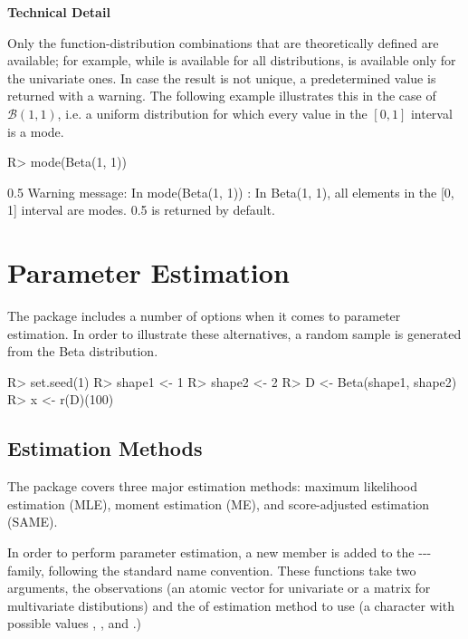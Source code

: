 \documentclass[nojss]{jss}
\newcommand{\fct}[1]{\code{#1()}}
\begin{document}
\begin{leftbar}
\textbf{Technical Detail}

Only the function-distribution combinations that are theoretically defined are available; for example, while \fct{var} is available for all distributions, \fct{sd} is available only for the univariate ones. In case the result is not unique, a predetermined value is returned with a warning. The following example illustrates this in the case of $\mathcal{B}(1, 1)$, i.e. a uniform distribution for which every value in the $[0, 1]$ interval is a mode.

\begin{CodeChunk}
\begin{CodeInput}
R> mode(Beta(1, 1))
\end{CodeInput}
\begin{CodeOutput}
[1] 0.5
Warning message:
In mode(Beta(1, 1)) :
  In Beta(1, 1), all elements in the [0, 1] interval are modes.
  0.5 is returned by default.
\end{CodeOutput}
\end{CodeChunk}

\end{leftbar}

\section[Parameter Estimation]{Parameter Estimation} \label{s:estim}

The  package includes a number of options when it comes to parameter estimation. In order to illustrate these alternatives, a random sample is generated from the Beta distribution.

\begin{Schunk}
\begin{Sinput}
R> set.seed(1)
R> shape1 <- 1
R> shape2 <- 2
R> D <- Beta(shape1, shape2)
R> x <- r(D)(100)
\end{Sinput}
\end{Schunk}

\subsection[Estimation Methods]{Estimation Methods}\label{ss:estim-methods}

The  package covers three major estimation methods: maximum likelihood estimation (MLE), moment estimation (ME), and score-adjusted estimation (SAME).

In order to perform parameter estimation, a new \fct{e<name>} member is added to the \fct{d}-\fct{p}-\fct{q}-\fct{r} family, following the standard  name convention. These \fct{e<name>} functions take two arguments, the observations  (an atomic vector for univariate or a matrix for multivariate distibutions) and the  of estimation method to use (a character with possible values , , and .)
\end{document}
